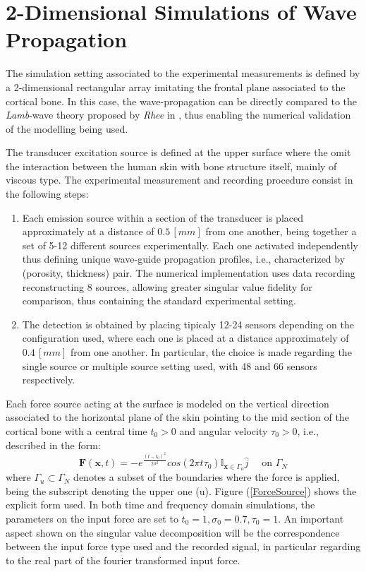 \section{2-Dimensional Simulations of Wave Propagation}
The simulation setting associated to the experimental measurements is defined by a 2-dimensional rectangular array imitating the frontal plane associated to the cortical bone. In this case, the wave-propagation can be directly compared to the \textit{Lamb}-wave  theory proposed by \textit{Rhee} in \cite{Rhee2007}, thus enabling the numerical validation of the modelling being used. 

The transducer excitation source is defined at the upper surface where the omit the interaction between the human skin with bone structure itself, mainly of viscous type.
The experimental measurement and recording procedure consist in the following steps:
\begin{enumerate}
    \item Each emission source within a section of the transducer is placed approximately at a distance of $0.5 \, [mm]$ from one another, being together a set of 5-12 different sources experimentally. Each one activated independently thus defining unique wave-guide propagation profiles, i.e., characterized by (porosity, thickness) pair. The numerical implementation uses data recording reconstructing 8 sources, allowing greater singular value fidelity for comparison, thus containing the standard experimental setting.
    
    \item The detection is obtained by placing tipicaly 12-24 sensors depending on the configuration used, where each one is placed at a distance approximately of $0.4 \, [mm]$ from one another. In particular, the choice is made regarding the single source or multiple source setting used, with 48 and 66 sensors respectively.
\end{enumerate}
Each force source acting at the surface is modeled on the vertical direction associated to the horizontal plane of the skin pointing to the mid section of the cortical bone with a central time $t_0 > 0$ and angular velocity $\tau_0 > 0$, i.e., described in the form:
\begin{equation}
    \label{Force-eq}
    \mathbf{F}(\mathbf{x},t) = - e^{\frac{(t-t_0)^2}{2\sigma^2}} cos( 2 \pi t \tau_0 ) \mathbb{I}_{\mathbf{x} \in \Gamma_u} \hat{j} \quad \text{ on } \Gamma_N
\end{equation}
where $\Gamma_u \subset \Gamma_N$ denotes a subset of the boundaries where the force is applied, being the subscript denoting the upper one (u). Figure (\ref{ForceSource}) shows the explicit form used. In both time and frequency domain simulations, the parameters on the input force are set to $t_0 = 1, \sigma_0 = 0.7, \tau_0 = 1$. An important aspect shown on the singular value decomposition will be the correspondence between the input force type used and the recorded signal, in particular regarding to the real part of the fourier transformed input force.

